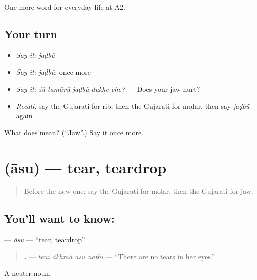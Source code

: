 \begin{grammarlens}[title={What you've built}]
One more word for everyday life at A2.
\end{grammarlens}

\subsection*{Your turn}
\begin{itemize}
\raggedright
  \item \emph{Say it:} \emph{jaḍbũ}
  \item \emph{Say it:} \emph{jaḍbũ}, once more
  \item \emph{Say it:} \emph{śũ tamārũ jaḍbũ dukhe che?} — Does your jaw hurt?
  \item \emph{Recall:} say the Gujarati for rib, then the Gujarati for molar, then say \emph{jaḍbũ} again
\end{itemize}

\begin{tcolorbox}[breakable,colback=teal!4,colframe=teal!35!black,title={Before you move on}]
What does  mean? (\textquotedblleft{}Jaw\textquotedblright{}.) Say it once more.
\end{tcolorbox}
\section[\texorpdfstring{\gu{આંસુ} (ā̃su)}{આંસુ (ā̃su)}]{ (ā̃su) — tear, teardrop}

\label{lesson:GU-C230-asu}



\begin{quote}
Before the new one: say the Gujarati for molar, then the Gujarati for jaw.
\end{quote}

\subsection*{You'll want to know: }
\textbf{} — \emph{ā̃su} — \textquotedblleft{}tear, teardrop\textquotedblright{}.

\begin{quote}
\textbf{   .} — \emph{tenī ā̃khmā̃ ā̃su nathī} — \textquotedblleft{}There are no tears in her eyes.\textquotedblright{}
\end{quote}

A neuter noun.

